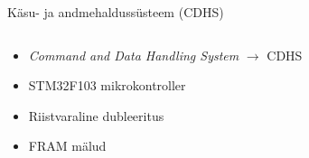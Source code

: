 \documentclass[pdf,draft]{beamer}
\begin{document}
\begin{frame}{Käsu- ja andmehaldussüsteem (CDHS)}
    \begin{columns}
        \begin{column}{0.5\textwidth}
            \begin{itemize}
                \item \textit{Command and Data Handling System} \(\to\) CDHS
                \item STM32F103 mikrokontroller
                \item Riistvaraline dubleeritus
                \item FRAM mälud
            \end{itemize}
        \end{column}
        \begin{column}{0.5\textwidth}
        \end{column}
    \end{columns}
\end{frame}
\end{document}
